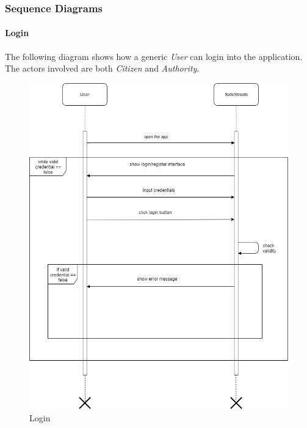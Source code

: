 \documentclass{article}
\begin{document}
\subsubsection{Sequence Diagrams}
\paragraph{Login}
The following diagram shows how a generic \textit{User} can login into the application. The actors involved
are both \textit{Citizen} and \textit{Authority}.  
\begin{figure}[H]
    \centering
    \includegraphics[scale=0.5]{img/sequence_diagrams/login.png}
    \caption{Login}
\end{figure}
\end{document}
